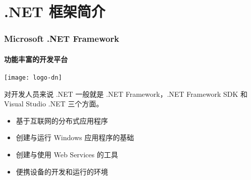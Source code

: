 \section{.NET 框架简介}

\begin{frame}
\frametitle{Microsoft .NET Framework}
\framesubtitle{功能丰富的开发平台}

\centering \texttt{[image: logo-dn]}

\CJKindent 对开发人员来说 .NET 一般就是 .NET Framework，.NET Framework SDK 和 Visual Studio .NET
三个方面。

\begin{itemize}
\item \large 基于互联网的分布式应用程序
\item \large 创建与运行 Windows 应用程序的基础
\item \large 创建与使用 Web Services 的工具
\item \large 便携设备的开发和运行的环境
\end{itemize}
\end{frame}

